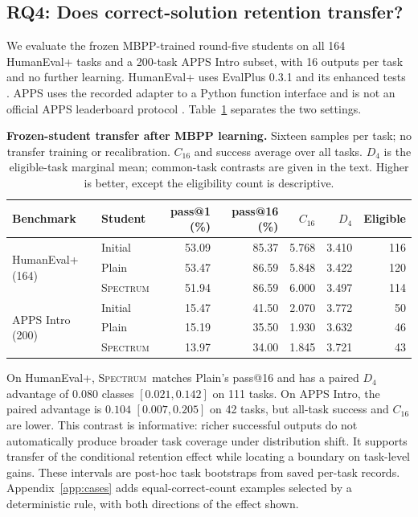 \documentclass{article}
\newcommand{\method}{\textsc{Spectrum}}
\begin{document}
\subsection{RQ4: Does correct-solution retention transfer?}
\label{sec:rq4}
We evaluate the frozen MBPP-trained round-five students on all 164 HumanEval+ tasks and a 200-task APPS Intro subset, with 16 outputs per task and no further learning. HumanEval+ uses EvalPlus 0.3.1 and its enhanced tests \citep{liu2023evalplus}. APPS uses the recorded adapter to a Python function interface and is not an official APPS leaderboard protocol \citep{hendrycks2021apps}. Table~\ref{tab:transfer} separates the two settings.

\begin{table}[t]
\centering\small
\caption{\textbf{Frozen-student transfer after MBPP learning.} Sixteen samples per task; no transfer training or recalibration. $C_{16}$ and success average over all tasks. $D_4$ is the eligible-task marginal mean; common-task contrasts are given in the text. Higher is better, except the eligibility count is descriptive.}
\label{tab:transfer}
\begin{tabular}{llrrrrr}
\toprule
Benchmark & Student & pass@1 (\%) & pass@16 (\%) & $C_{16}$ & $D_4$ & Eligible\\
\midrule
\multirow{3}{*}{HumanEval+ (164)} & Initial &53.09&85.37&5.768&3.410&116\\
 & Plain &53.47&86.59&5.848&3.422&120\\
 & \method &51.94&86.59&6.000&3.497&114\\
\midrule
\multirow{3}{*}{APPS Intro (200)} & Initial &15.47&41.50&2.070&3.772&50\\
 & Plain &15.19&35.50&1.930&3.632&46\\
 & \method &13.97&34.00&1.845&3.721&43\\
\bottomrule
\end{tabular}
\end{table}

On HumanEval+, \method\ matches Plain's pass@16 and has a paired $D_4$ advantage of $0.080$ classes $[0.021,0.142]$ on 111 tasks. On APPS Intro, the paired advantage is $0.104$ $[0.007,0.205]$ on 42 tasks, but all-task success and $C_{16}$ are lower. This contrast is informative: richer successful outputs do not automatically produce broader task coverage under distribution shift. It supports transfer of the conditional retention effect while locating a boundary on task-level gains. These intervals are post-hoc task bootstraps from saved per-task records. Appendix~\ref{app:cases} adds equal-correct-count examples selected by a deterministic rule, with both directions of the effect shown.
\end{document}
